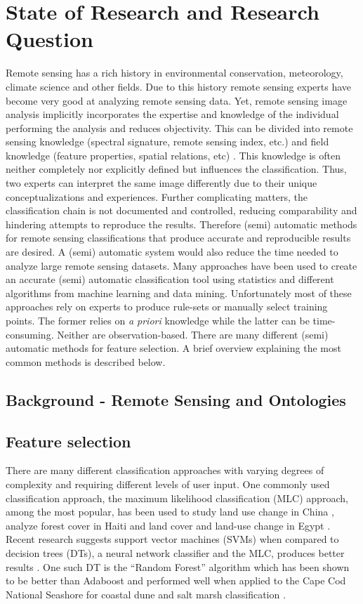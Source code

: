 \documentclass[a4paper,12pt]{article}
\begin{document}
\section{State of Research and Research Question}
Remote sensing has a rich history in environmental conservation, meteorology,
climate science and other fields. Due to this history remote sensing experts
have become very good at analyzing remote sensing data. Yet, remote sensing
image analysis implicitly incorporates the expertise and knowledge of the
individual performing the analysis and reduces objectivity. This can be divided
into remote sensing knowledge (spectral signature, remote sensing index, etc.)
and field knowledge (feature properties, spatial relations, etc)
\cite{Andres2013a}. This knowledge is often neither completely nor explicitly
defined but influences the classification. Thus, two experts can interpret the
same image differently due to their unique conceptualizations and experiences.
Further complicating matters, the classification chain is not documented and
controlled, reducing comparability and hindering attempts to reproduce the
results\cite{Arvor2013}. Therefore (semi) automatic methods for remote sensing
classifications that produce accurate and reproducible results are desired.
A (semi) automatic system would also reduce the time needed to analyze large
remote sensing datasets. Many approaches have been used to create an accurate
(semi) automatic classification tool using statistics and different algorithms
from machine learning and data mining. Unfortunately most of these approaches
rely on experts to produce rule-sets or manually select training points. The
former relies on \emph{a priori} knowledge while the latter can be
time-consuming.
Neither are observation-based. There are many different (semi) automatic methods
for feature selection. A brief overview explaining the most common methods is
described below.

\subsection{Background - Remote Sensing and Ontologies}

\subsection{Feature selection}

There are many different classification approaches with varying degrees of
complexity and requiring different levels of user input. One commonly used
classification approach, the maximum likelihood classification (MLC) approach,
among the most popular, has been used to study land use change in China
\cite{Ding2007}, analyze forest cover in Haiti \cite{Churches2014} and land
cover and land-use change in Egypt \cite{Shalaby2007}. Recent research suggests
support vector machines (SVMs) when compared to decision trees (DTs), a neural
network classifier and the MLC, produces better results \cite{Huang2002}. One
such DT is the ``Random Forest'' algorithm which has been shown to be better
than Adaboost \cite{Chan2008} and performed well when applied to the Cape Cod
National Seashore for coastal dune and salt marsh classification
\cite{Timm2012}.
\end{document}
